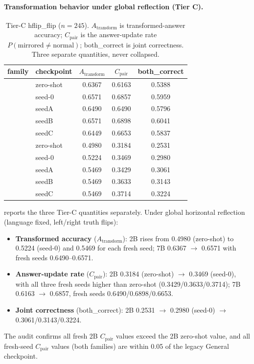 \paragraph{Transformation behavior under global reflection (Tier C).}
\begin{table}[t]
\centering
\small
\setlength{\tabcolsep}{4pt}
\begin{tabular}{llccc}
\toprule
family & checkpoint & $A_{\text{transform}}$ & $C_{\text{pair}}$ & both\_correct \\
\midrule
\qwen{} & zero-shot & 0.6367 & 0.6163 & 0.5388 \\
\qwen{} & seed-0 & 0.6571 & 0.6857 & 0.5959 \\
\qwen{} & seedA & 0.6490 & 0.6490 & 0.5796 \\
\qwen{} & seedB & 0.6571 & 0.6898 & 0.6041 \\
\qwen{} & seedC & 0.6449 & 0.6653 & 0.5837 \\
\smol{} & zero-shot & 0.4980 & 0.3184 & 0.2531 \\
\smol{} & seed-0 & 0.5224 & 0.3469 & 0.2980 \\
\smol{} & seedA & 0.5469 & 0.3429 & 0.3061 \\
\smol{} & seedB & 0.5469 & 0.3633 & 0.3143 \\
\smol{} & seedC & 0.5469 & 0.3714 & 0.3224 \\
\bottomrule
\end{tabular}
\caption{Tier-C hflip\_flip ($n=245$). $A_{\text{transform}}$ is
transformed-answer accuracy; $C_{\text{pair}}$ is the answer-update rate
$P(\text{mirrored}\neq\text{normal})$; both\_correct is joint correctness.
Three separate quantities, never collapsed.}
\label{tab:tierc}
\end{table}

 reports the three Tier-C quantities separately. Under
global horizontal reflection (language fixed, left/right truth flips):
\begin{itemize}[leftmargin=*]
  \item \textbf{Transformed accuracy} ($A_{\text{transform}}$): 2B rises
        from 0.4980 (zero-shot) to 0.5224 (seed-0) and 0.5469 for each
        fresh seed; 7B 0.6367 $\rightarrow$ 0.6571 with fresh seeds
        0.6490--0.6571.
  \item \textbf{Answer-update rate} ($C_{\text{pair}}$): 2B 0.3184
        (zero-shot) $\rightarrow$ 0.3469 (seed-0), with all three fresh
        seeds higher than zero-shot (0.3429/0.3633/0.3714); 7B 0.6163
        $\rightarrow$ 0.6857, fresh seeds 0.6490/0.6898/0.6653.
  \item \textbf{Joint correctness} (both\_correct): 2B 0.2531
        $\rightarrow$ 0.2980 (seed-0) $\rightarrow$ 0.3061/0.3143/0.3224.
\end{itemize}
The audit confirms all fresh 2B $C_{\text{pair}}$ values exceed the 2B
zero-shot value, and all fresh-seed $C_{\text{pair}}$ values (both
families) are within 0.05 of the legacy General checkpoint.

